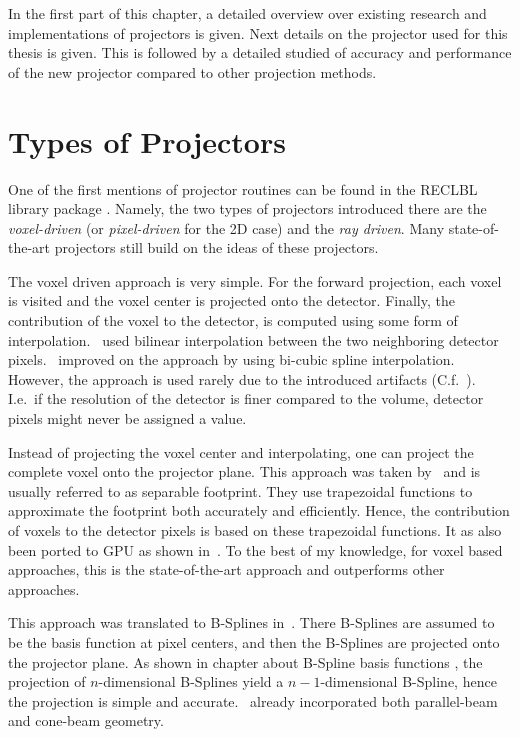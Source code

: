 In the first part of this chapter, a detailed overview over existing research and implementations of
projectors is given. Next details on the projector used for this thesis is given. This is followed
by a detailed studied of accuracy and performance of the new projector compared to other projection
methods.

\section{Types of Projectors}\label{sec:projector_types}

One of the first mentions of projector routines can be found in the RECLBL library package
. Namely, the two types of projectors introduced there are the
\textit{voxel-driven} (or \textit{pixel-driven} for the 2D case) and the \textit{ray driven}. Many
state-of-the-art projectors still build on the ideas of these projectors.

The voxel driven approach is very simple. For the forward projection, each voxel is visited and the
voxel center is projected onto the detector. Finally, the contribution of the voxel to the detector,
is computed using some form of interpolation.~\cite{peters_algorithms_1981} used bilinear
interpolation between the two neighboring detector pixels.~\cite{harauz_interpolation_1983}
improved on the approach by using bi-cubic spline interpolation. However, the approach is used
rarely due to the introduced artifacts (C.f.~\cite[Chapter~3.3]{levakhina_three-dimensional_2014}).
I.e.\ if the resolution of the detector is finer compared to the volume, detector pixels might never
be assigned a value. 

Instead of projecting the voxel center and interpolating, one can project the complete voxel onto
the projector plane. This approach was taken by~\cite{long_3d_2010, long_3d_2010-1} and is usually
referred to as separable footprint. They use trapezoidal functions to approximate the footprint both
accurately and efficiently. Hence, the contribution of voxels to the detector pixels is based on
these trapezoidal functions. It as also been ported to \gls{GPU} as shown in~\cite{wu_gpu_2011,
	xie_effective_2015, chapdelaine_new_2018}. To the best of my knowledge, for voxel based
approaches, this is the state-of-the-art approach and outperforms other approaches.

This approach was translated to B-Splines in~\cite{momey_b-spline_2012, momey_spline_2015}. There
B-Splines are assumed to be the basis function at pixel centers, and then the B-Splines are
projected onto the projector plane. As shown in chapter about B-Spline basis functions
, the projection of \(n\)-dimensional B-Splines yield a
\(n-1\)-dimensional B-Spline, hence the projection is simple and
accurate.~\cite{momey_b-spline_2012} already incorporated both parallel-beam and cone-beam
geometry.

